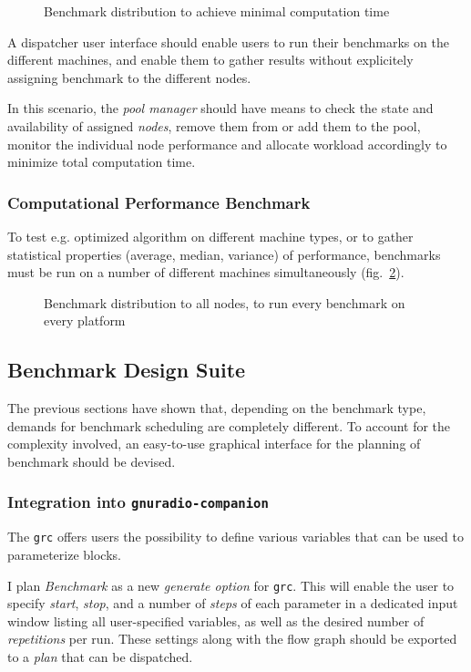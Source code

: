 \documentclass[a4paper]{IEEEtran}
\newcommand{\grc}{\texttt{grc}\xspace}
\begin{document}
\begin{figure}[h] \small\centering 
\caption{\label{fig:minimizetime}Benchmark distribution to achieve minimal
computation time} \end{figure}

A dispatcher user interface should enable users to run their benchmarks on the
different machines, and enable them to gather results without explicitely
assigning benchmark to the different nodes.

In this scenario, the \emph{pool manager} should have means to check the state
and availability of assigned \emph{nodes}, remove them from or add them to the
pool, monitor the individual node performance and allocate workload accordingly
to minimize total computation time.

\subsubsection*{Computational Performance Benchmark} To test e.g. optimized
algorithm on different machine types, or to gather statistical properties
(average, median, variance) of performance, benchmarks must be run on a number
of different machines simultaneously (fig.~\ref{fig:runonall}).

\begin{figure}[h] \small\centering 
\caption{\label{fig:runonall}Benchmark distribution to all nodes, to run every
benchmark on every platform} \end{figure}

\subsection{Benchmark Design Suite}

The previous sections have shown that, depending on the benchmark type, demands
for benchmark scheduling are completely different. To account for the complexity
involved, an easy-to-use graphical interface for the planning of benchmark should
be devised.

\subsubsection*{Integration into \texttt{gnuradio-companion}}

The \grc offers users the possibility to define various variables that
can be used to parameterize blocks.

I plan \emph{Benchmark} as a new \textit{generate option} for \grc.
This will enable the user to specify \textsl{start}, \textsl{stop}, and a number of
\textsl{steps} of each parameter in a dedicated input window listing all user-specified
variables, as well as the desired number of \textsl{repetitions} per run.
These settings along with the flow graph should be exported to a \emph{plan} that can be
dispatched.
\end{document}
